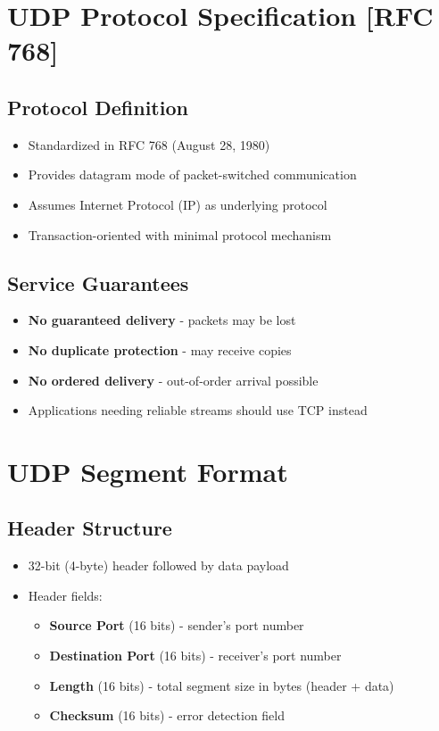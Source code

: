 \documentclass[12pt]{article}
\begin{document}
\section{UDP Protocol Specification [RFC 768]}

\subsection{Protocol Definition}
\begin{itemize}
    \item Standardized in RFC 768 (August 28, 1980)
    \item Provides datagram mode of packet-switched communication
    \item Assumes Internet Protocol (IP) as underlying protocol
    \item Transaction-oriented with minimal protocol mechanism
\end{itemize}

\subsection{Service Guarantees}
\begin{itemize}
    \item \textbf{No guaranteed delivery} - packets may be lost
    \item \textbf{No duplicate protection} - may receive copies
    \item \textbf{No ordered delivery} - out-of-order arrival possible
    \item Applications needing reliable streams should use TCP instead
\end{itemize}

\section{UDP Segment Format}

\subsection{Header Structure}
\begin{itemize}
    \item 32-bit (4-byte) header followed by data payload
    \item Header fields:
          \begin{itemize}
              \item \textbf{Source Port} (16 bits) - sender's port number
              \item \textbf{Destination Port} (16 bits) - receiver's port number
              \item \textbf{Length} (16 bits) - total segment size in bytes (header + data)
              \item \textbf{Checksum} (16 bits) - error detection field
          \end{itemize}
\end{itemize}
\end{document}
